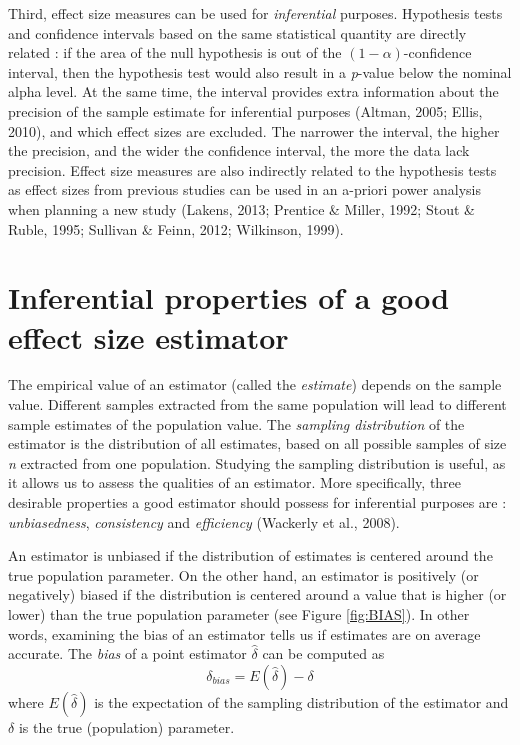 \documentclass[
  english,
  man,floatsintext]{apa6}
\begin{document}
Third, effect size measures can be used for \emph{inferential} purposes. Hypothesis tests and confidence intervals based on the same statistical quantity are directly related : if the area of the null hypothesis is out of the \((1-\alpha)\)-confidence interval, then the hypothesis test would also result in a \emph{p}-value below the nominal alpha level. At the same time, the interval provides extra information about the precision of the sample estimate for inferential purposes (Altman, 2005; Ellis, 2010), and which effect sizes are excluded. The narrower the interval, the higher the precision, and the wider the confidence interval, the more the data lack precision. Effect size measures are also indirectly related to the hypothesis tests as effect sizes from previous studies can be used in an a-priori power analysis when planning a new study (Lakens, 2013; Prentice \& Miller, 1992; Stout \& Ruble, 1995; Sullivan \& Feinn, 2012; Wilkinson, 1999).

\hypertarget{inferential-properties-of-a-good-effect-size-estimator}{%
\section{Inferential properties of a good effect size estimator}\label{inferential-properties-of-a-good-effect-size-estimator}}

The empirical value of an estimator (called the \emph{estimate}) depends on the sample value. Different samples extracted from the same population will lead to different sample estimates of the population value. The \emph{sampling distribution} of the estimator is the distribution of all estimates, based on all possible samples of size \emph{n} extracted from one population. Studying the sampling distribution is useful, as it allows us to assess the qualities of an estimator. More specifically, three desirable properties a good estimator should possess for inferential purposes are : \emph{unbiasedness}, \emph{consistency} and \emph{efficiency} (Wackerly et al., 2008).

An estimator is unbiased if the distribution of estimates is centered around the true population parameter. On the other hand, an estimator is positively (or negatively) biased if the distribution is centered around a value that is higher (or lower) than the true population parameter (see Figure \ref{fig:BIAS}). In other words, examining the bias of an estimator tells us if estimates are on average accurate. The \emph{bias} of a point estimator \(\hat{\delta}\) can be computed as
\begin{equation} 
\delta_{bias}=E(\hat{\delta})-\delta
\label{eqn:BIAS}
\end{equation}
where \(E(\hat{\delta})\) is the expectation of the sampling distribution of the estimator and \(\delta\) is the true (population) parameter.
\end{document}

